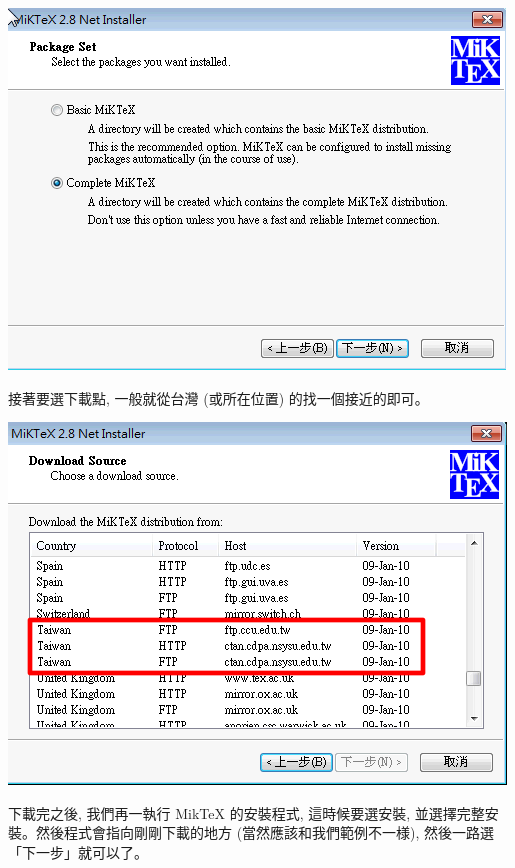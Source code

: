 \documentclass[12pt]{report}
\newcommand{\hei}[1]{{\CJKfamily{hei}#1}}   			%
\begin{document}
\begin{center}
\includegraphics[scale=0.5]{Complete.png}
\end{center}

接著要選下載點, 一般就從台灣 (或所在位置) 的找一個接近的即可。

\begin{center}
\includegraphics[scale=0.5]{source.png}
\end{center}

下載完之後, 我們{\hei{再一執行 MikTeX 的安裝程式}}, 這時候要選安裝, 並選擇完整安裝。然後程式會指向剛剛下載的地方 (當然應該和我們範例不一様), 然後一路選「下一步」就可以了。
\end{document}
